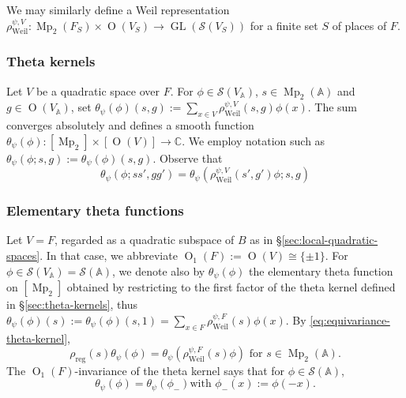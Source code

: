 \documentclass[reqno,10pt]{amsart}
\theoremstyle{plain} %
\theoremstyle{definition}
\theoremstyle{plain} %
\theoremstyle{remark}
\theoremstyle{itplain} %
\theoremstyle{remark} %
\numberwithin{equation}{section}
\DeclareMathOperator{\Mp}{Mp}
\DeclareMathOperator{\GL}{GL}
\DeclareMathOperator{\Weil}{Weil}
\def\O{\operatorname{O}}
\DeclareMathOperator{\reg}{reg}
\begin{document}
We may similarly define a Weil representation $\rho_{\Weil}^{\psi,V} : \Mp_2(F_S) \times \O(V_S) \rightarrow \GL(\mathcal{S}(V_S))$ for a finite set $S$ of places of $F$.




\subsubsection{Theta kernels\label{sec:theta-kernels}}
\label{sec-3-2-5}
Let $V$ be a quadratic space over $F$.  For $\phi \in \mathcal{S}(V_\mathbb{A})$, $s \in \Mp_2(\mathbb{A})$ and $g \in \O(V_\mathbb{A})$, set $\theta_{\psi}(\phi)(s,g) := \sum_{x \in V} \rho_{\Weil}^{\psi,V}(s,g) \phi(x)$.  The sum converges absolutely and defines a smooth function $\theta_{\psi}(\phi) : [\Mp_2] \times [\O(V)] \rightarrow \mathbb{C}$.  We employ notation such as $\theta_{\psi}(\phi;s,g) := \theta_{\psi}(\phi)(s,g)$.  Observe that
\begin{equation}\label{eq:equivariance-theta-kernel}
  \theta_{\psi}(\phi;s s', g g')
  = \theta_{\psi}(\rho_{\Weil}^{\psi,V}(s',g') \phi;s,g)
\end{equation}
\subsubsection{Elementary theta functions\label{sec:elem-theta-fns}}
\label{sec-3-2-6}
Let $V = F$, regarded as a quadratic subspace of $B$ as in \S\ref{sec:local-quadratic-spaces}.  In that case, we abbreviate $\O_1(F) := \O(V) \cong \{\pm 1\}$.  For $\phi \in \mathcal{S}(V_\mathbb{A}) = \mathcal{S}(\mathbb{A})$, we denote also by $\theta_{\psi}(\phi)$ the elementary theta function on $[\Mp_2]$ obtained by restricting to the first factor of the theta kernel defined in \S\ref{sec:theta-kernels}, thus $\theta_{\psi}(\phi)(s) := \theta_{\psi}(\phi)(s,1) = \sum_{x \in F} \rho_{\Weil}^{\psi,F}(s) \phi(x)$.  By \eqref{eq:equivariance-theta-kernel},
\begin{equation}\label{eq:equivariance-etf}
  \rho_{\reg}(s) \theta_{\psi}(\phi)
  = \theta_{\psi}(\rho_{\Weil}^{\psi,F}(s) \phi)
  \text{ for }
  s \in \Mp_2(\mathbb{A}).
\end{equation}
The $\O_1(F)$-invariance of the theta kernel says that for $\phi \in \mathcal{S}(\mathbb{A})$,
\begin{equation}\label{eqn:O1-invariance-elementary-theta-fn}
  \text{$\theta_{\psi}(\phi) = \theta_{\psi}(\phi_-)$
    with $\phi_-(x) := \phi(-x)$.}
\end{equation}
\end{document}
